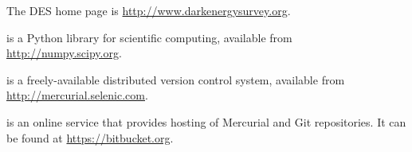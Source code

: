 \documentclass[draftmode,draftwater]{memarticle}
\begin{document}
\begin{thebibliography}{99}

 The DES home page is \url{http://www.darkenergysurvey.org}.

  is a Python library for scientific computing, available from \url{http://numpy.scipy.org}.

  is a freely-available distributed
  version control system, available from
  \url{http://mercurial.selenic.com}.

  is an online service that
  provides hosting of Mercurial and Git repositories. It can be found
  at \url{https://bitbucket.org}.

\end{thebibliography}
\end{document}
